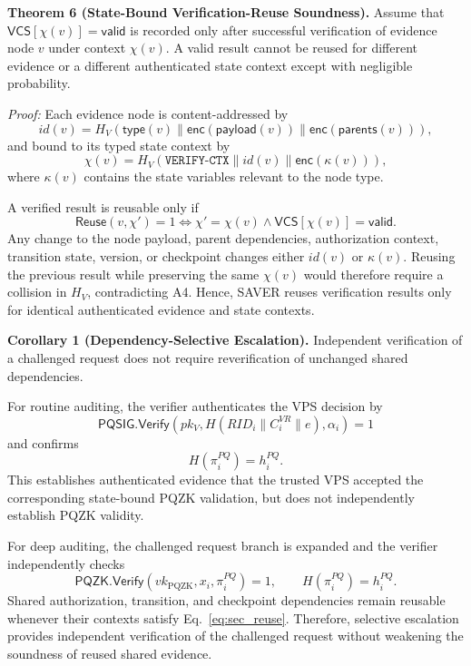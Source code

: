 \documentclass[lettersize,journal]{IEEEtran}
\begin{document}
\textbf{Theorem 6 (State-Bound Verification-Reuse Soundness).}
Assume that $\mathsf{VCS}[\chi(v)]=\mathsf{valid}$ is recorded only
after successful verification of evidence node $v$ under context
$\chi(v)$. A valid result cannot be reused for different evidence or a
different authenticated state context except with negligible
probability.

\emph{Proof:}
Each evidence node is content-addressed by
\begin{equation}
id(v)=
H_V(\mathsf{type}(v)\parallel
\mathsf{enc}(\mathsf{payload}(v))\parallel
\mathsf{enc}(\mathsf{parents}(v))),
\end{equation}
and bound to its typed state context by
\begin{equation}
\chi(v)=
H_V(\texttt{VERIFY-CTX}\parallel
id(v)\parallel\mathsf{enc}(\kappa(v))),
\label{eq:sec_saver_ctx}
\end{equation}
where $\kappa(v)$ contains the state variables relevant to the node
type.

A verified result is reusable only if
\begin{equation}
\mathsf{Reuse}(v,\chi')=1
\Longleftrightarrow
\chi'=\chi(v)
\land
\mathsf{VCS}[\chi(v)]=\mathsf{valid}.
\label{eq:sec_reuse}
\end{equation}
Any change to the node payload, parent dependencies, authorization
context, transition state, version, or checkpoint changes either
$id(v)$ or $\kappa(v)$. Reusing the previous result while preserving
the same $\chi(v)$ would therefore require a collision in $H_V$,
contradicting A4. Hence, SAVER reuses verification results only for
identical authenticated evidence and state contexts.

\medskip
\noindent\textbf{Corollary 1 (Dependency-Selective Escalation).}
Independent verification of a challenged request does not require
reverification of unchanged shared dependencies.

For routine auditing, the verifier authenticates the VPS decision by
\begin{equation}
\mathsf{PQSIG.Verify}
(pk_V,H(RID_i\parallel C_i^{VR}\parallel e),\alpha_i)=1
\end{equation}
and confirms
\begin{equation}
H(\pi_i^{PQ})=h_i^{PQ}.
\end{equation}
This establishes authenticated evidence that the trusted VPS accepted
the corresponding state-bound PQZK validation, but does not
independently establish PQZK validity.

For deep auditing, the challenged request branch is expanded and the
verifier independently checks
\begin{equation}
\mathsf{PQZK.Verify}
(vk_{\mathrm{PQZK}},x_i,\pi_i^{PQ})=1,
\qquad
H(\pi_i^{PQ})=h_i^{PQ}.
\end{equation}
Shared authorization, transition, and checkpoint dependencies remain
reusable whenever their contexts satisfy
Eq.~\eqref{eq:sec_reuse}. Therefore, selective escalation provides
independent verification of the challenged request without weakening
the soundness of reused shared evidence.
\end{document}
